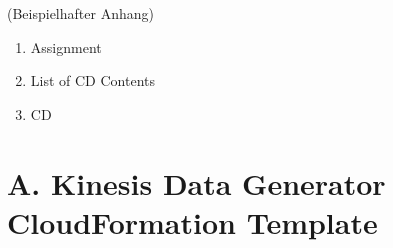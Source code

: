 
\addchap{\langanhang}

(Beispielhafter Anhang)
 

{\Large
\begin{enumerate}[label=\Alph*.]
	\item Assignment
	\item List of CD Contents
	\item CD 
\end{enumerate}
}
\pagebreak
\pagebreak
\section*{A. Kinesis Data Generator CloudFormation Template}\label{app:cloudformation}


